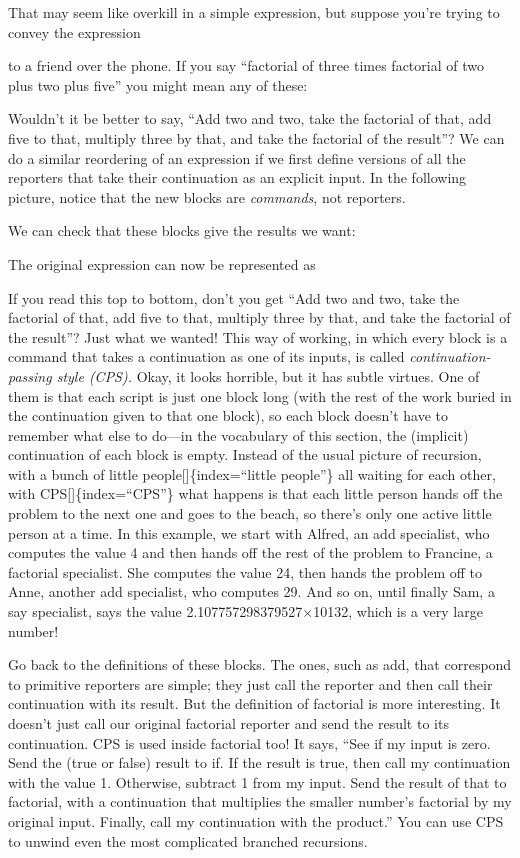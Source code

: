 \documentclass[
  letterpaper,
]{book}
\begin{document}
That may seem like overkill in a simple expression, but suppose you're
trying to convey the expression

to a friend over the phone. If you say ``factorial of three times
factorial of two plus two plus five'' you might mean any of these:

Wouldn't it be better to say, ``Add two and two, take the factorial of
that, add five to that, multiply three by that, and take the factorial
of the result''? We can do a similar reordering of an expression if we
first define versions of all the reporters that take their continuation
as an explicit input. In the following picture, notice that the new
blocks are \emph{commands}, not reporters.

We can check that these blocks give the results we want:

The original expression can now be represented as

If you read this top to bottom, don't you get ``Add two and two, take
the factorial of that, add five to that, multiply three by that, and
take the factorial of the result''? Just what we wanted! This way of
working, in which every block is a command that takes a continuation as
one of its inputs, is called \emph{continuation-passing style (CPS).}
Okay, it looks horrible, but it has subtle virtues. One of them is that
each script is just one block long (with the rest of the work buried in
the continuation given to that one block), so each block doesn't have to
remember what else to do---in the vocabulary of this section, the
(implicit) continuation of each block is empty. Instead of the usual
picture of recursion, with a bunch of little
people{[}{]}\{index=``little people''\} all waiting for each other, with
CPS{[}{]}\{index=``CPS''\} what happens is that each little person hands
off the problem to the next one and goes to the beach, so there's only
one active little person at a time. In this example, we start with
Alfred, an add specialist, who computes the value 4 and then hands off
the rest of the problem to Francine, a factorial specialist. She
computes the value 24, then hands the problem off to Anne, another add
specialist, who computes 29. And so on, until finally Sam, a say
specialist, says the value 2.107757298379527×10132, which is a very
large number!

Go back to the definitions of these blocks. The ones, such as add, that
correspond to primitive reporters are simple; they just call the
reporter and then call their continuation with its result. But the
definition of factorial is more interesting. It doesn't just call our
original factorial reporter and send the result to its continuation. CPS
is used inside factorial too! It says, ``See if my input is zero. Send
the (true or false) result to if. If the result is true, then call my
continuation with the value 1. Otherwise, subtract 1 from my input. Send
the result of that to factorial, with a continuation that multiplies the
smaller number's factorial by my original input. Finally, call my
continuation with the product.'' You can use CPS to unwind even the most
complicated branched recursions.
\end{document}
